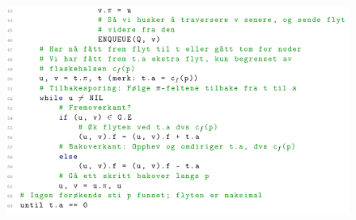 \documentclass[12pt]{report}
\begin{document}

\begin{figure}[H]
	\begin{Center}
		\includegraphics[width=5.1in,height=3.08in]{./media/image206.png}
	\end{Center}
\end{figure}



\par


\printbibliography
\end{document}
